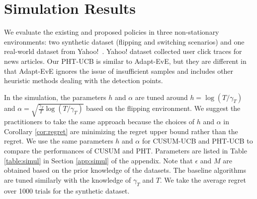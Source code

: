 \documentclass[letterpaper]{article} %
\newcommand{\blue}{}
\newcommand{\green}{}
\begin{document}
\section{Simulation Results}\label{sec:simul}
We evaluate the
{\blue existing and proposed policies
in three non-stationary environments:
two synthetic dataset (flipping and switching scenarios) and one
real-world dataset from Yahoo!~\cite{YahooWebScope}.
Yahoo! dataset collected user click traces for news articles.}
Our PHT-UCB is similar to Adapt-EvE, but they are different in that Adapt-EvE ignores the issue of insufficient samples and includes other {\blue heuristic} methods dealing with the detection points.

{\green
In the simulation, the parameters $h$ and $\alpha$ are tuned around
$h=\log(T/\gamma_T)$ and
$\alpha=\sqrt{\frac{\gamma_T}{T}\log(T/\gamma_T)}$ based on the
flipping environment. We suggest the practitioners to take the same approach because the choices of $h$ and $\alpha$ in Corollary \ref{cor:regret} are minimizing the regret upper bound rather than the regret. We use the same parameters $h$ and $\alpha$ for
CUSUM-UCB and PHT-UCB to compare the performances of CUSUM and
PHT. Parameters are listed in Table \ref{table:simul} in Section \ref{app:simul} of the appendix. Note that $\epsilon$ and $M$ are obtained based on the prior knowledge of the datasets.
The baseline algorithms are tuned similarly with the knowledge of $\gamma_T$ and $T$.
We take the average regret over 1000 trials for the synthetic dataset.%
}
\end{document}
